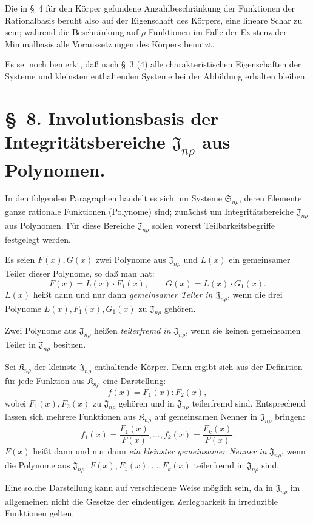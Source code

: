 \documentclass[11pt]{article}
\providecommand{\Kfield}{\mathfrak{K}}
\providecommand{\Ssys}{\mathfrak{S}}
\providecommand{\Jdom}{\mathfrak{J}}
\begin{document}
Die in \S\ 4 für den Körper gefundene Anzahlbeschränkung der Funktionen der Rationalbasis beruht also auf der Eigenschaft des Körpers, eine lineare Schar zu sein; während die Beschränkung auf $\rho$ Funktionen im Falle der Existenz der Minimalbasis alle Voraussetzungen des Körpers benutzt.

Es sei noch bemerkt, daß nach \S\ 3 (4) alle charakteristischen Eigenschaften der Systeme und kleinsten enthaltenden Systeme bei der Abbildung erhalten bleiben.

\clearpage
\section*{\S\ 8. Involutionsbasis der Integritätsbereiche $\Jdom_{n\rho}$ aus Polynomen.}

In den folgenden Paragraphen handelt es sich um Systeme $\Ssys_{n\rho}$, deren Elemente ganze rationale Funktionen (Polynome) sind; zunächst um Integritätsbereiche $\Jdom_{n\rho}$ aus Polynomen. Für diese Bereiche $\Jdom_{n\rho}$ sollen vorerst Teilbarkeitsbegriffe festgelegt werden.

Es seien $F(x),G(x)$ zwei Polynome aus $\Jdom_{n\rho}$ und $L(x)$ ein gemeinsamer Teiler dieser Polynome, so daß man hat:
\[
  F(x)=L(x)\cdot F_1(x),\qquad G(x)=L(x)\cdot G_1(x).
\]
$L(x)$ heißt dann und nur dann \emph{gemeinsamer Teiler in $\Jdom_{n\rho}$}, wenn die drei Polynome $L(x),F_1(x),G_1(x)$ zu $\Jdom_{n\rho}$ gehören.

Zwei Polynome aus $\Jdom_{n\rho}$ heißen \emph{teilerfremd in $\Jdom_{n\rho}$}, wenn sie keinen gemeinsamen Teiler in $\Jdom_{n\rho}$ besitzen.

Sei $\Kfield_{n\rho}$ der kleinste $\Jdom_{n\rho}$ enthaltende Körper. Dann ergibt sich aus der Definition für jede Funktion aus $\Kfield_{n\rho}$ eine Darstellung:
\[
  f(x)=F_1(x):F_2(x),
\]
wobei $F_1(x),F_2(x)$ zu $\Jdom_{n\rho}$ gehören und in $\Jdom_{n\rho}$ teilerfremd sind. Entsprechend lassen sich mehrere Funktionen aus $\Kfield_{n\rho}$ auf gemeinsamen Nenner in $\Jdom_{n\rho}$ bringen:
\[
  f_1(x)=\frac{F_1(x)}{F(x)},\ldots,
  f_k(x)=\frac{F_k(x)}{F(x)}.
\]
$F(x)$ heißt dann und nur dann \emph{ein kleinster gemeinsamer Nenner in $\Jdom_{n\rho}$}, wenn die Polynome aus $\Jdom_{n\rho}$: $F(x),F_1(x),\ldots,F_k(x)$ teilerfremd in $\Jdom_{n\rho}$ sind.

Eine solche Darstellung kann auf verschiedene Weise möglich sein, da in $\Jdom_{n\rho}$ im allgemeinen nicht die Gesetze der eindeutigen Zerlegbarkeit in irreduzible Funktionen gelten.
\end{document}

